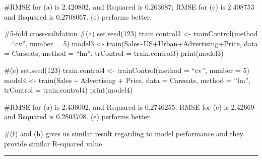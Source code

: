 \documentclass[
]{article}
\begin{document}
\#RMSE for (a) is 2.420802, and Rsquared is 0.263687; RMSE for (e) is
2.408753 and Rsquared is 0.2708067. (e) performs better.

\#5-fold cross-validation \#(a) set.seed(123) train.control3 \textless-
trainControl(method = ``cv'', number = 5) model3 \textless-
train(Sales\textasciitilde US+Urban+Advertising+Price, data = Carseats,
method = ``lm'', trControl = train.control3) print(model3)

\#(e) set.seed(123) train.control4 \textless- trainControl(method =
``cv'', number = 5) model4 \textless- train(Sales \textasciitilde{}
Advertising + Price, data = Carseats, method = ``lm'', trControl =
train.control4) print(model4)

\#RMSE for (a) is 2.436002, and Rsquared is 0.2746255; RMSE for (e) is
2.42669 and Rsquared is 0.2803708. (e) performs better.

\#(f) and (h) gives us similar result regarding to model performance and
they provide similar R-squared value.

\begin{center}\rule{0.5\linewidth}{\linethickness}\end{center}
\end{document}
